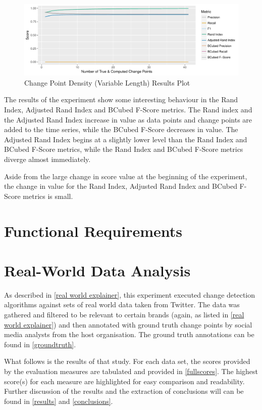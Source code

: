 \documentclass{uvamscse}	%
\begin{document}
\begin{figure}[H]
    \includegraphics[width=\textwidth]{figures/Experiment7}
    \caption{Change Point Density (Variable Length) Results Plot}
    \label{fig:Experiment8}
\end{figure}

The results of the experiment show some interesting behaviour in the Rand Index, Adjusted Rand Index and BCubed F-Score metrics. The Rand index and the Adjusted Rand Index increase in value as data points and change points are added to the time series, while the BCubed F-Score decreases in value. The Adjusted Rand Index begins at a slightly lower level than the Rand Index and BCubed F-Score metrics, while the Rand Index and BCubed F-Score metrics diverge almost immediately.

Aside from the large change in score value at the beginning of the experiment, the change in value for the Rand Index, Adjusted Rand Index and BCubed F-Score metrics is small.

\section{Functional Requirements}

\section{Real-World Data Analysis}

As described in \autoref{real world explainer}, this experiment executed change detection algorithms against sets of real world data taken from Twitter. The data was gathered and filtered to be relevant to certain brands (again, as listed in \autoref{real world explainer}) and then annotated with ground truth change points by social media analysts from the host organisation. The ground truth annotations can be found in \autoref{groundtruth}.

What follows is the results of that study. For each data set, the scores provided by the evaluation measures are tabulated and provided in \autoref{fullscores}. The highest score(s) for each measure are highlighted for easy comparison and readability. Further discussion of the results and the extraction of conclusions will can be found in \autoref{results} and \autoref{conclusions}.
\end{document}
